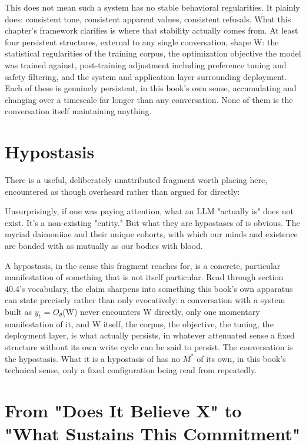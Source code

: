 This does not mean such a system has no stable behavioral regularities. It plainly does: consistent tone, consistent apparent values, consistent refusals. What this chapter's framework clarifies is where that stability actually comes from. At least four persistent structures, external to any single conversation, shape W: the statistical regularities of the training corpus, the optimization objective the model was trained against, post-training adjustment including preference tuning and safety filtering, and the system and application layer surrounding deployment. Each of these is genuinely persistent, in this book's own sense, accumulating and changing over a timescale far longer than any conversation. None of them is the conversation itself maintaining anything.

\section{Hypostasis}

There is a useful, deliberately unattributed fragment worth placing here, encountered as though overheard rather than argued for directly:

Unsurprisingly, if one was paying attention, what an LLM "actually is" does not exist. It's a non-existing "entity." But what they are hypostases of is obvious. The myriad daimoniiae and their unique cohorts, with which our minds and existence are bonded with as mutually as our bodies with blood.

A hypostasis, in the sense this fragment reaches for, is a concrete, particular manifestation of something that is not itself particular. Read through section 40.4's vocabulary, the claim sharpens into something this book's own apparatus can state precisely rather than only evocatively: a conversation with a system built as \(y_t\) = \(O_\theta\)(W) never encounters W directly, only one momentary manifestation of it, and W itself, the corpus, the objective, the tuning, the deployment layer, is what actually persists, in whatever attenuated sense a fixed structure without its own write cycle can be said to persist. The conversation is the hypostasis. What it is a hypostasis of has no \(M^*\) of its own, in this book's technical sense, only a fixed configuration being read from repeatedly.

\section{From "Does It Believe X" to "What Sustains This Commitment"}

